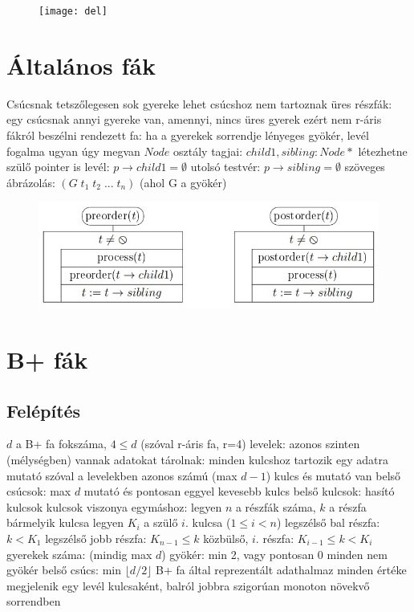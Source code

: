\documentclass[12pt,a4paper]{article}
\begin{document}
\begin{figure}[h!]
	\centering
	\texttt{[image: del]}
\end{figure}

\pagebreak

\section{Általános fák}

\begin{outline}
	\1 Csúcsnak tetszőlegesen sok gyereke lehet
	\1 csúcshoz nem tartoznak üres részfák: egy csúcsnak annyi gyereke van, amennyi, nincs üres gyerek
		\2 ezért nem r-áris fákról beszélni
	\1 rendezett fa: ha a gyerekek sorrendje lényeges
	\1 gyökér, levél fogalma ugyan úgy megvan
	\1 $Node$ osztály tagjai: $child1,sibling:Node*$
		\2 létezhetne szülő pointer is
		\2 levél: $p \to child1 = \emptyset$
		\2 utolsó testvér: $p \to sibling = \emptyset$
	\1 szöveges ábrázolás: $(G\; t_1\; t_2\; ...\; t_n)$ (ahol G a gyökér)
\end{outline}


\begin{figure}[h!]
	\centering
	\includegraphics[width=0.9\linewidth]{általános fa bejárás}
\end{figure}

\pagebreak

\section{B+ fák}

\subsection{Felépítés}

\begin{outline}
	\1 $d$ a B+ fa fokszáma, $4 \le d$ (szóval r-áris fa, r=4)
	\1 levelek:
		\2 azonos szinten (mélységben) vannak
		\2 adatokat tárolnak: minden kulcshoz tartozik egy adatra mutató
		\2 szóval a levelekben azonos számú (max $d-1$) kulcs és mutató van
	\1 belső csúcsok:
		\2 max $d$ mutató és pontosan eggyel kevesebb kulcs
		\2 belső kulcsok: hasító kulcsok
		\2 kulcsok viszonya egymáshoz:
			\3 legyen $n$ a részfák száma, $k$ a részfa bármelyik kulcsa
			\3 legyen $K_i$ a szülő $i$. kulcsa ($1 \le i < n$)
			\3 legszélső bal részfa: $k < K_1$
			\3 legszélső jobb részfa: $K_{n-1} \le k$
			\3 közbülső, $i$. részfa: $K_{i-1} \le k < K_i$
	\1 gyerekek száma: (mindig max $d$)
		\2 gyökér: min 2, vagy pontosan 0
		\2 minden nem gyökér belső csúcs: min $\lfloor d/2 \rfloor$
	\1 B+ fa által reprezentált adathalmaz minden értéke megjelenik egy levél kulcsaként, balról jobbra szigorúan monoton növekvő sorrendben
\end{outline}
\end{document}
